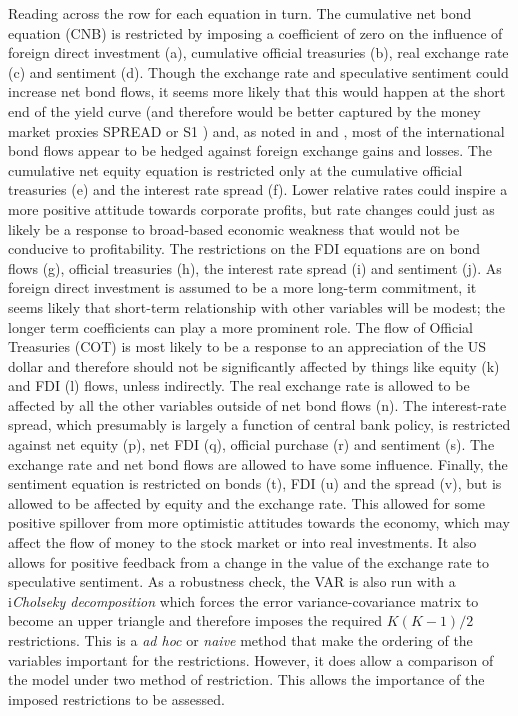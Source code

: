 \documentclass[jrfm,communication,submit,moreauthors,pdftex]{Definitions/mdpi}
\begin{document}
 
Reading across the row for each equation in turn. The cumulative net bond equation (CNB) is restricted by imposing a coefficient of zero on the influence of foreign direct investment (a), cumulative official treasuries (b), real exchange rate (c) and sentiment (d).  Though the exchange rate and speculative sentiment could increase net bond flows, it seems more likely that this would happen at the short end of the yield curve (and therefore would be better captured by the money market proxies SPREAD or S1 ) and, as noted in \citep[p. 3]{Siourounis2004Capital} and \citep{HauEquity}, most of the international bond flows appear to be hedged against foreign exchange gains and losses.    The cumulative net equity equation is restricted only at the cumulative official treasuries (e) and the interest rate spread (f).  Lower relative rates could inspire a more positive attitude towards corporate profits, but rate changes could just as likely be a response to broad-based economic weakness that would not be conducive to profitability. The restrictions on the FDI equations are on bond flows (g), official treasuries (h), the interest rate spread (i) and sentiment (j).  As foreign direct investment is assumed to be a more long-term commitment, it seems likely that short-term relationship with other variables will be modest; the longer term coefficients can play a more prominent role.   The flow of Official Treasuries (COT) is most likely to be a response to an appreciation of the US dollar and therefore should not be significantly affected by things like equity (k) and FDI (l) flows, unless indirectly.  The real exchange rate is allowed to be affected by all the other variables outside of net bond flows (n).  The interest-rate spread, which presumably is largely a function of central bank policy, is restricted against net equity (p), net FDI (q), official purchase (r) and sentiment (s).  The exchange rate and net bond flows are allowed to have some influence.  Finally, the sentiment equation is restricted on bonds (t), FDI (u) and the spread (v), but is allowed to be affected by equity and the exchange rate.  This allowed for some positive spillover from more optimistic attitudes towards the economy, which may affect the flow of money to the stock market or into real investments.   It also allows for positive feedback from a change in the value of the exchange rate to speculative sentiment. 
As a robustness check, the VAR is also run with a i\emph{Cholseky decomposition} which forces the error variance-covariance matrix to become an upper triangle and therefore imposes the required $K(K-1)/2$ restrictions. This is a \emph{ad hoc} or \emph{naive} method that make the ordering of the variables important for the restrictions. However, it does allow a comparison of the model under two method of restriction.  This allows the importance of the imposed restrictions to be assessed. 
\end{document}
